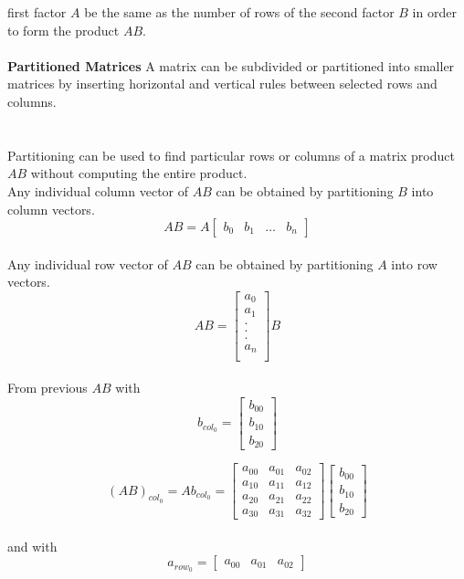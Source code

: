\documentclass[a4paper, 12pt]{article}
\begin{document}
first factor $A$ be the same as the number of rows of the second factor $B$ in order
to form the product $AB$.
\\
\\
\textbf{Partitioned Matrices} A matrix can be subdivided or partitioned into smaller
matrices by inserting horizontal and vertical rules between selected rows and columns.\\
\\
\\
Partitioning can be used to find particular rows or columns of a matrix product $AB$ without
computing the entire product. 
\\
Any individual column vector of $AB$ can be obtained by partitioning $B$ into column vectors.
\[
AB = A\left[
{\begin{array}{cccc}
b_0 & b_1 & ... &b_n
\end{array}}
\right]
\]
\\
Any individual row vector of $AB$ can be obtained by partitioning $A$ into row vectors.
\[
AB = \left[
{\begin{array}{c}
a_0\\
a_1\\
.\\
.\\
.\\
a_n\\
\end{array}}
\right]B
\]
\\
From previous $AB$ with 
\[
b_{col_0} = 
\left[
{
\begin{array}{c}
b_{00} \\
b_{10} \\
b_{20}
\end{array}
}
\right]
\]

\[
(AB)_{col_0} = Ab_{col_0} = 
\left[
{
    \begin{array}{ccc}
        a_{00} &  a_{01} &  a_{02} \\
        a_{10} &  a_{11} &  a_{12} \\
        a_{20} &  a_{21} &  a_{22} \\
        a_{30} &  a_{31} &  a_{32}
    \end{array}
}
\right]
\left[
{
    \begin{array}{c}
        b_{00} \\
        b_{10} \\
        b_{20}
    \end{array}
}
\right]
\]
\\
and with
\\
\[
a_{row_0} =
\left[
{
\begin{array}{ccc}
a_{00} & a_{01} & a_{02}
\end{array}
}
\right]
\]
\end{document}
